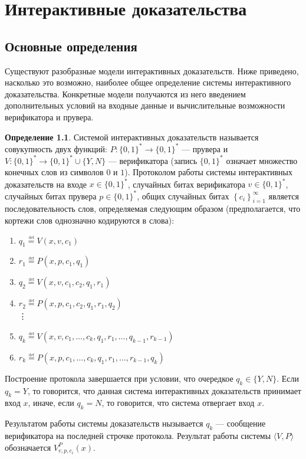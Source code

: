 \documentclass{mipt-thesis-bs}
\theoremstyle{plain}
\theoremstyle{definition}
\newtheorem{definition}{Определение}
\newcommand{\word}{\{0, 1\}^*}
\newcommand{\defeq}{\overset{\underset{\mathrm{def}}{}}{=}}
\begin{document}
\chapter{Интерактивные доказательства}
\section{Основные определения}
Существуют разобразные модели интерактивных доказательств. Ниже приведено, насколько это возможно, наиболее общее определение системы интерактивного доказательства. Конкретные модели получаются из него введением дополнительных условий на входные данные и вычислительные возможности верификатора и прувера.
\begin{definition}\label{ip_system}
Системой интерактивных доказательств называется совукупность двух функций: $P: \word \longrightarrow \word$ --- прувера и $V: \word \longrightarrow \word \cup \{Y, N\}$ --- верификатора (запись $\word$ означает множество конечных слов из символов $0$ и $1$). Протоколом работы системы интерактивных доказательств на входе $x \in \word$, случайных битах верификатора $v \in \word$, случайных битах прувера $p \in \word$, общих случайных битах $\left\{c_i\right\}_{i=1}^{\infty}$ является последовательность слов, определяемая следующим образом (предполагается, что кортежи слов однозначно кодируются в слова):
\begin{enumerate}
    \item $q_1 \defeq V(x, v, c_1)$
    \item $r_1 \defeq P(x, p, c_1, q_1)$
    \item $q_2 \defeq V(x, v, c_1, c_2, q_1, r_1)$
    \item $r_2 \defeq P(x, p, c_1, c_2, q_1, r_1, q_2)$\\
    \vdots
    \item $q_k \defeq V(x, v, c_1, \ldots, c_k, q_1, r_1, \ldots, q_{k-1}, r_{k-1})$
    \item $r_k \defeq P(x, p, c_1, \ldots, c_k, q_1, r_1, \ldots, r_{k-1}, q_k)$
\end{enumerate}
Построение протокола завершается при условии, что очередкое $q_k \in \{Y, N\}$. Если $q_k = Y$, то говорится, что данная система интерактивных доказательств принимает вход $x$, иначе, если $q_k = N$, то говорится, что система отвергает вход $x$.

Результатом работы системы доказательств нызывается $q_k$ --- сообщение верификатора на последней строчке протокола. Результат работы системы $\langle V, P\rangle$ обозначается $V^{P}_{v, p, c_i}(x)$.
\end{definition}
\end{document}

